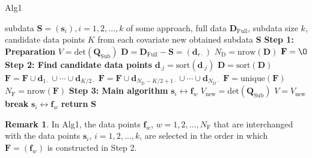 \documentclass[12pt]{article}
\theoremstyle{definition}
\newtheorem{remark}{Remark}[section]
\begin{document}
	\begin{algorithm}
		\caption{Alg1}
		\begin{algorithmic}
			\Require subdata $\textbf{S}=(\textbf{s}_{i}), i=1,2,\ldots,k$  of some approach, full data $\textbf{D}_{\text{Full}}$, subdata size $k$, candidate data points $K$ from each covariate
			\Ensure new obtained subdata \textbf{S}
			\State \textbf{Step 1: Preparation}
			\State $V=\text{det}\left(\textbf{Q}_{\text{Sub}}\right)$ 
			\State $\textbf{D}=\textbf{D}_{\text{Full}}-\textbf{S}=(\textbf{d}_{r\cdot})$ 
			\State $N_{\text{D}}=\text{nrow}(\textbf{D})$ 
			\State $\textbf{F}=\O$ 
			\State \textbf{Step 2: Find candidate data points}
			\State $\textbf{d}_{\cdot j}=\text{sort}(\textbf{d}_{\cdot j})$ 
			\State $\textbf{D}=\text{sort}(\textbf{D})$ 
			\State $\textbf{F}=\textbf{F}\cup\textbf{d}_{1\cdot}\cup\cdots\cup \textbf{d}_{K/2\cdot}$
			\State $\textbf{F}=\textbf{F}\cup\textbf{d}_{N_{\text{D}}-K/2+1\cdot}\cup\cdots\cup \textbf{d}_{N_{\text{D}}\cdot}$
			\EndFor
			\State $\textbf{F}=\text{unique}(\textbf{F})$ 
			\State $N_{\text{F}}=\text{nrow}(\textbf{F})$ 
			\State \textbf{Step 3: Main algorithm}
			\State $\textbf{s}_i\leftrightarrow\textbf{f}_w$ 
			\State $V_{\text{new}}=\text{det}\left(\textbf{Q}_{\text{Sub}}\right)$  
			\State $V=V_\text{new}$
			\State \textbf{break}
			\Else
			\State $\textbf{s}_i\leftrightarrow\textbf{f}_w$
			\EndIf
			\EndFor
			\EndFor
			\State \textbf{return} \textbf{S}
		\end{algorithmic}
	\end{algorithm}
	
	\begin{remark}\label{rem_alg}
		In Alg1, the data points $\textbf{f}_w$, $w=1,2,\ldots,N_{\text{F}}$ that are interchanged with the data points $\textbf{s}_i$, $i=1,2,\ldots,k$, are selected in the order in which $\textbf{F}=(\textbf{f}_w)$ is constructed in Step 2.
	\end{remark}
	
\end{document}

